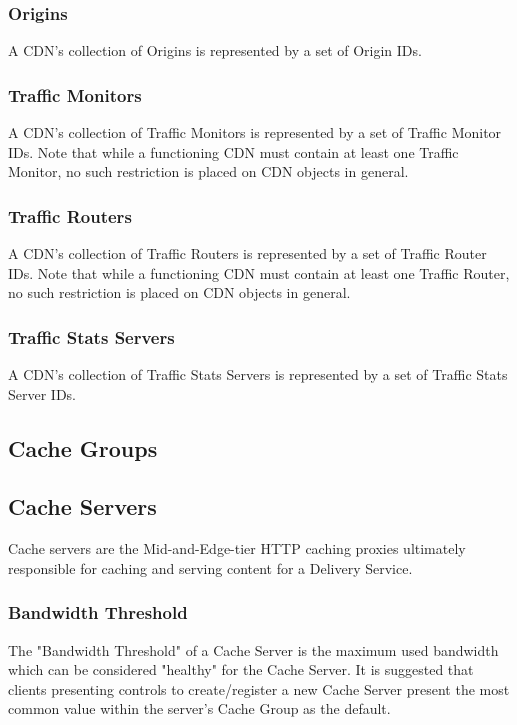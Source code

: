 \subsubsection{Origins}
A CDN's collection of Origins is represented by a set of Origin IDs.

\subsubsection{Traffic Monitors}
A CDN's collection of Traffic Monitors is represented by a set of Traffic
Monitor IDs. Note that while a functioning CDN must contain at least one Traffic
Monitor, no such restriction is placed on CDN objects in general.

\subsubsection{Traffic Routers}
A CDN's collection of Traffic Routers is represented by a set of Traffic Router
IDs. Note that while a functioning CDN must contain at least one Traffic Router,
no such restriction is placed on CDN objects in general.

\subsubsection{Traffic Stats Servers}
A CDN's collection of Traffic Stats Servers is represented by a set of Traffic
Stats Server IDs.



\subsection{Cache Groups}



\subsection{Cache Servers}
Cache servers are the Mid-and-Edge-tier HTTP caching proxies ultimately
responsible for caching and serving content for a Delivery Service.

\subsubsection{Bandwidth Threshold}
The "Bandwidth Threshold" of a Cache Server is the maximum used bandwidth which
can be considered "healthy" for the Cache Server. It is suggested that clients
presenting controls to create/register a new Cache Server present the most
common value within the server's Cache Group as the default.

